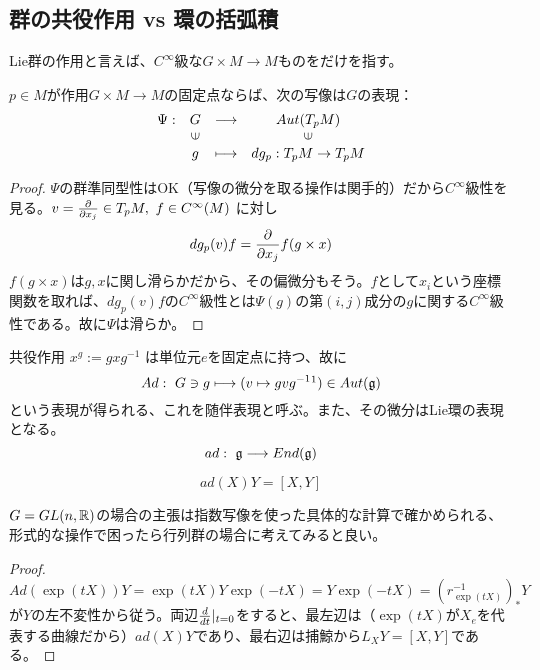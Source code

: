 \subsection{群の共役作用 vs 環の括弧積}
Lie群の作用と言えば、$C^\infty$級な$G\times M\to M$ものをだけを指す。
\begin{thm}
    $p\in M$が作用$G\times M\to M$の固定点ならば、次の写像は$G$の表現：
    \[\begin{array}{cccc}
        \Psi: & G & \longrightarrow & Aut(T_pM) \\
         & \mapin & & \mapin\\
         & g & \longmapsto & dg_p:T_pM\to T_pM
    \end{array}\]
\end{thm}
\begin{proof}
    $\Psi$の群準同型性はOK（写像の微分を取る操作は関手的）だから$C^\infty$級性を見る。$v=\frac{\partial }{\partial x_j}\in T_pM,\ f\in C^\infty(M)$ に対し
    \[dg_p(v)f=\frac{\partial }{\partial x_j}f(g\times x)\]
    $f(g\times x)$は$g,x$に関し滑らかだから、その偏微分もそう。$f$として$x_i$という座標関数を取れば、$dg_p(v)f$の$C^\infty$級性とは$\Psi(g)$の第$(i,j)$成分の$g$に関する$C^\infty$級性である。故に$\Psi$は滑らか。
\end{proof}
\begin{defi}
    共役作用 $x^g:=gxg^{-1}$ は単位元$e$を固定点に持つ、故に
    \[Ad:\ G\ni g\longmapsto (v\mapsto gvg^{-1}\footnotemark )\in Aut(\g)\]
    という表現が得られる、これを随伴表現と呼ぶ。また、その微分はLie環の表現となる。
    \[ad:\ \mathfrak{g}\longrightarrow End(\mathfrak{g})\]
\end{defi}
\begin{prop}
    \[ad(X)Y=[X,Y]\]
\end{prop}
$G=GL(n,\mathbb{R})$の場合の主張は指数写像を使った具体的な計算で確かめられる、形式的な操作で困ったら行列群の場合に考えてみると良い。
\begin{proof}
    \[Ad(\exp(tX))Y=\exp(tX)Y\exp(-tX)=Y\exp(-tX)=(r_{\exp(tX)}^{-1})_*Y\]
    が$Y$の左不変性から従う。両辺$\frac{d}{dt}\lvert_{t=0}$をすると、最左辺は（$\exp(tX)$が$X_e$を代表する曲線だから）$ad(X)Y$であり、最右辺は捕鯨から$L_X Y=[X,Y]$である。
\end{proof}

